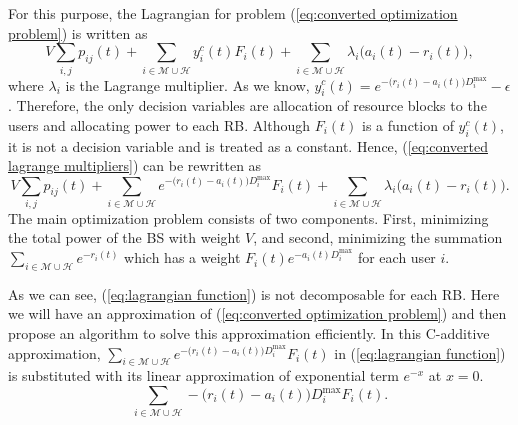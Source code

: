 \documentclass[journal,draftclsnofoot,onecolumn,12pt]{IEEEtran}%
\begin{document}
For this purpose, the Lagrangian for  problem (\ref{eq:converted optimization problem}) is written as
{
\begin{equation}\label{eq:converted lagrange multipliers}
V\sum_{i,j}p_{ij}(t)+\sum_{i\in \mathcal{M} \cup \mathcal{H}}y^c_i(t)F_i(t)+\sum_{i\in \mathcal{M} \cup \mathcal{H}}\lambda_i \big(a_i(t)-r_i(t)\big),
\end{equation}}
where $\lambda_i$ is the Lagrange multiplier.  As we know, {$y^c_i(t)=e^{-\big(r_i(t)-a_i(t)\big)D_i^{\max}}-\epsilon$}. Therefore, the only decision variables are allocation of resource blocks to the users and allocating power to each RB. Although $F_i(t)$ is a function of {$y^c_i(t)$}, it is not a decision variable and is treated as a constant.  Hence, (\ref{eq:converted lagrange multipliers}) can be rewritten as 
{
\begin{equation}\label{eq:lagrangian function}
V\sum_{i,j}p_{ij}(t)+\sum_{i\in \mathcal{M} \cup \mathcal{H}}e^{-\big(r_i(t)-a_i(t)\big)D_i^{\max}}F_i(t)+\sum_{i\in \mathcal{M} \cup \mathcal{H}}\lambda_i\big(a_i(t)-r_i(t)\big).
\end{equation}}
The main optimization problem consists of two components. First, minimizing the total power of the BS with  weight $V$, and second, minimizing the summation $\sum_{i\in \mathcal{M} \cup \mathcal{H}}e^{-r_i(t)}$ which has a weight $F_i(t)e^{-a_i(t)D_i^{\max}}$ for each user $i$. 


As we can see, (\ref{eq:lagrangian function}) is not decomposable for each RB. Here we will have an approximation of (\ref{eq:converted optimization problem}) and then propose an algorithm to solve this approximation efficiently.  In this C-additive approximation, $\sum_{i\in \mathcal{M} \cup \mathcal{H}}e^{-\big(r_i(t)-a_i(t)\big)D_i^{\max}}F_i(t)$ in  (\ref{eq:lagrangian function}) is substituted with its linear approximation of exponential term $e^{-x}$ at $x=0$.
{
\begin{equation}\label{eq:C-additive approximation}
\sum_{i\in \mathcal{M} \cup \mathcal{H}} -\big(r_i(t)-a_i(t)\big)D_i^{\max} F_i(t).
\end{equation}
}
\end{document}
